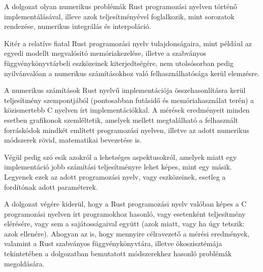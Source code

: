 
A dolgozat olyan numerikus problémák Rust programozási nyelven történő implementálásával, illeve azok teljesítményével foglalkozik, mint sorozatok rendezése, numerikus integrálás és interpoláció.

Kitér a relatíve fiatal Rust programozási nyelv tulajdonságaira, mint például az egyedi modellt megvalósító memóriakezelése, illetve a szabványos függvénykönyvtárbeli eszközeinek kiterjedtségére, nem utolsósorban pedig nyilvánvalóan a numerikus számításokhoz való felhasználhatósága kerül elemzésre.

A numerikus számítások Rust nyelvű implementációja összehasonlításra kerül teljesítmény szempontjából (pontosabban futásidő és memóriahasználat terén) a közismertebb C nyelven írt implementációkkal. A mérések eredményeit minden esetben grafikonok szemléltetik, amelyek mellett megtalálható a felhasznált forráskódok mindkét említett programozási nyelven, illetve az adott numerikus módszerek rövid, matematikai bevezetése is.

Végül pedig szó esik azokról a lehetséges aspektusokról, amelyek miatt egy implementáció jobb számítási teljesítményre lehet képes, mint egy másik. Legyenek ezek az adott programozási nyelv, vagy eszközeinek, esetleg a fordítónak adott paraméterek.

A dolgozat végére kiderül, hogy a Rust programozási nyelv valóban képes a C programozási nyelven írt programokhoz hasonló, vagy esetenként teljesítmény elérésére, vagy sem a sajátosságaival együtt (azok miatt, vagy ha úgy tetszik: azok ellenére). Ahogyan az is, hogy mennyire célravezető a mérési eredmények, valamint a Rust szabványos függvénykönyvtára, illetve ökoszisztémája tekintetében a dolgozatban bemutatott módszerekhez hasonló problémák megoldására.
